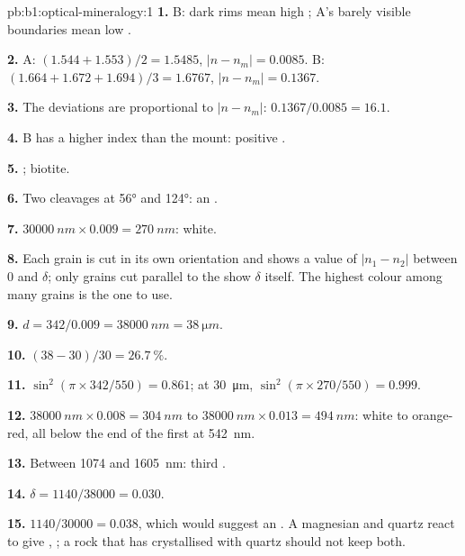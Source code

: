 \begin{solution}{pb:b1:optical-mineralogy:1}
\textbf{1.} B: dark rims mean high ; A's barely visible boundaries mean
low .

\textbf{2.} A: $(1.544 + 1.553)/2 = 1.5485$, $|n - n_m| = 0.0085$. B:
$(1.664 + 1.672 + 1.694)/3 = 1.6767$, $|n - n_m| = 0.1367$.

\textbf{3.} The deviations are proportional to $|n - n_m|$: $0.1367/0.0085 =
16.1$.

\textbf{4.} B has a higher index than the mount: positive .

\textbf{5.} ; biotite.

\textbf{6.} Two cleavages at \ang{56} and \ang{124}: an .

\textbf{7.} $\qty{30000}{nm}\times0.009 = \qty{270}{nm}$:  white.

\textbf{8.} Each grain is cut in its own orientation and shows a value of
$|n_1 - n_2|$ between 0 and $\delta$; only grains cut parallel to the  show $\delta$ itself. The highest colour among many grains is the one to
use.

\textbf{9.} $d = 342/0.009 = \qty{38000}{nm} = \qty{38}{\micro m}$.

\textbf{10.} $(38 - 30)/30 = \qty{26.7}{\percent}$.

\textbf{11.} $\sin^2(\pi\times342/550) = 0.861$; at \qty{30}{\micro m},
$\sin^2(\pi\times270/550) = 0.999$.

\textbf{12.} $\qty{38000}{nm}\times0.008 = \qty{304}{nm}$ to
$\qty{38000}{nm}\times0.013 = \qty{494}{nm}$: white to orange-red, all below
the end of the first  at \qty{542}{nm}.

\textbf{13.} Between 1074 and \qty{1605}{nm}: third .

\textbf{14.} $\delta = 1140/38000 = 0.030$.

\textbf{15.} $1140/30000 = 0.038$, which would suggest an . A
magnesian  and quartz react to give ,
; a rock that has crystallised with quartz
should not keep both.


\end{solution}
